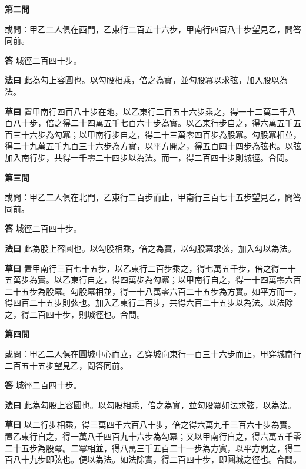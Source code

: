 \documentclass[11pt,a4paper]{article}
\newcommand{\problem}[1]{\par\noindent\textbf{\color{problemcolor}#1}\par\nopagebreak}
\newcommand{\answer}[1]{\par\noindent\textbf{答} #1\par}
\newcommand{\method}[1]{\par\noindent\textbf{法曰} #1\par}
\newcommand{\workings}[1]{\par\noindent\textbf{草曰} #1\par}
\begin{document}
\vspace{0.5cm}

\problem{第二問}

\noindent 或問：甲乙二人俱在西門，乙東行二百五十六步，甲南行四百八十步望見乙，問答同前。

\answer{城徑二百四十步。}

\method{此為勾上容圓也。以勾股相乘，倍之為實，並勾股冪以求弦，加入股以為法。}

\workings{置甲南行四百八十步在地，以乙東行二百五十六步乘之，得一十二萬二千八百八十步，倍之得二十四萬五千七百六十步為實。以乙東行步自之，得六萬五千五百三十六步為勾冪；以甲南行步自之，得二十三萬零四百步為股冪。勾股冪相並，得二十九萬五千九百三十六步為方實，以平方開之，得五百四十四步為弦也。以弦加入南行步，共得一千零二十四步以為法。而一，得二百四十步則城徑。合問。}

\vspace{0.5cm}

\problem{第三問}

\noindent 或問：甲乙二人俱在北門，乙東行二百步而止，甲南行三百七十五步望見乙，問答同前。

\answer{城徑二百四十步。}

\method{此為股上容圓也。以勾股相乘，倍之為實，以勾股冪求弦，加入勾以為法。}

\workings{置甲南行三百七十五步，以乙東行二百步乘之，得七萬五千步，倍之得一十五萬步為實。以乙東行自之，得四萬步為勾冪；以甲南行自之，得一十四萬零六百二十五步為股冪。勾股冪相並，得一十八萬零六百二十五步為方實。如平方而一，得四百二十五步則弦也。加入乙東行二百步，共得六百二十五步以為法。以法除之，得二百四十步，則城徑也。合問。}

\vspace{0.5cm}

\problem{第四問}

\noindent 或問：甲乙二人俱在圓城中心而立，乙穿城向東行一百三十六步而止，甲穿城南行二百五十五步望見乙，問答同前。

\answer{城徑二百四十步。}

\method{此為勾股上容圓也。以勾股相乘，倍之為實，並勾股冪如法求弦，以為法。}

\workings{以二行步相乘，得三萬四千六百八十步，倍之得六萬九千三百六十步為實。置乙東行自之，得一萬八千四百九十六步為勾冪；又以甲南行自之，得六萬五千零二十五步為股冪。二冪相並，得八萬三千五百二十一步為方實，以平方開之，得二百八十九步即弦也。便以為法。如法除實，得二百四十步，即圓城之徑也。合問。}
\end{document}
